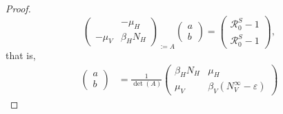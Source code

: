 \begin{proof}
\begin{equation*}
{\begin{pmatrix}
                    & - \mu_H 
                \\
                - \mu_V
                    & \beta_H N_H
            \end{pmatrix}
        }_{:=A}
%
        \begin{pmatrix}
            a
            \\
            b
        \end{pmatrix}
        =
        \begin{pmatrix}
            \mathcal{R}_0 ^ S - 1
            \\
            \mathcal{R}_0 ^ S - 1
        \end{pmatrix},
    \end{equation*}
    that is,
    \begin{equation} \label{eqn:ab_as_linear_solution}
        \begin{aligned}
            \begin{pmatrix}
                a
                \\
                b
            \end{pmatrix}
            & =
            \frac{1}{\det(A)}
            \begin{pmatrix}
                \beta_H N_H
                    & \mu_H
                \\
                \mu_V
                    & \beta_V \left(N_V ^ {\infty} -\varepsilon\right)
                    

\end{pmatrix}
\end{aligned}
\end{equation}
\end{proof}
